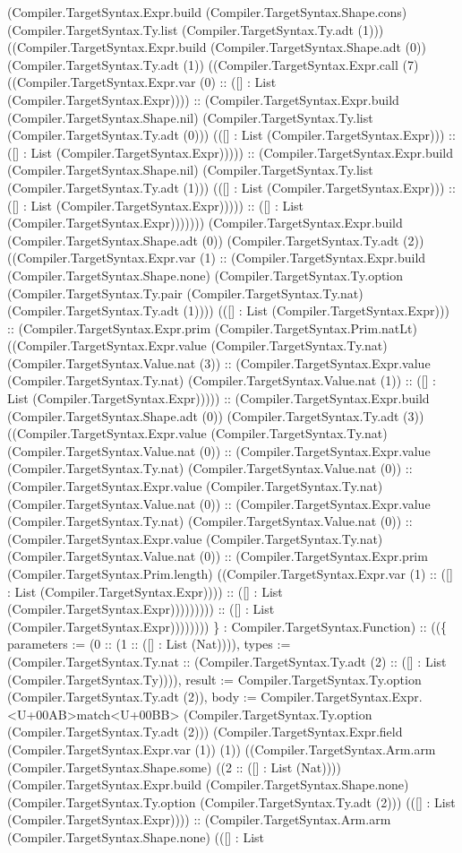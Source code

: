 \documentclass[11pt]{article}
\begin{document}
(Compiler.TargetSyntax.Expr.build (Compiler.TargetSyntax.Shape.cons) (Compiler.TargetSyntax.Ty.list (Compiler.TargetSyntax.Ty.adt (1))) ((Compiler.TargetSyntax.Expr.build (Compiler.TargetSyntax.Shape.adt (0)) (Compiler.TargetSyntax.Ty.adt (1)) ((Compiler.TargetSyntax.Expr.call (7) ((Compiler.TargetSyntax.Expr.var (0) :: ([] : List (Compiler.TargetSyntax.Expr)))) :: (Compiler.TargetSyntax.Expr.build (Compiler.TargetSyntax.Shape.nil) (Compiler.TargetSyntax.Ty.list (Compiler.TargetSyntax.Ty.adt (0))) (([] : List (Compiler.TargetSyntax.Expr))) :: ([] : List (Compiler.TargetSyntax.Expr))))) :: (Compiler.TargetSyntax.Expr.build (Compiler.TargetSyntax.Shape.nil) (Compiler.TargetSyntax.Ty.list (Compiler.TargetSyntax.Ty.adt (1))) (([] : List (Compiler.TargetSyntax.Expr))) :: ([] : List (Compiler.TargetSyntax.Expr))))) :: ([] : List (Compiler.TargetSyntax.Expr))))))) (Compiler.TargetSyntax.Expr.build (Compiler.TargetSyntax.Shape.adt (0)) (Compiler.TargetSyntax.Ty.adt (2)) ((Compiler.TargetSyntax.Expr.var (1) :: (Compiler.TargetSyntax.Expr.build (Compiler.TargetSyntax.Shape.none) (Compiler.TargetSyntax.Ty.option (Compiler.TargetSyntax.Ty.pair (Compiler.TargetSyntax.Ty.nat) (Compiler.TargetSyntax.Ty.adt (1)))) (([] : List (Compiler.TargetSyntax.Expr))) :: (Compiler.TargetSyntax.Expr.prim (Compiler.TargetSyntax.Prim.natLt) ((Compiler.TargetSyntax.Expr.value (Compiler.TargetSyntax.Ty.nat) (Compiler.TargetSyntax.Value.nat (3)) :: (Compiler.TargetSyntax.Expr.value (Compiler.TargetSyntax.Ty.nat) (Compiler.TargetSyntax.Value.nat (1)) :: ([] : List (Compiler.TargetSyntax.Expr))))) :: (Compiler.TargetSyntax.Expr.build (Compiler.TargetSyntax.Shape.adt (0)) (Compiler.TargetSyntax.Ty.adt (3)) ((Compiler.TargetSyntax.Expr.value (Compiler.TargetSyntax.Ty.nat) (Compiler.TargetSyntax.Value.nat (0)) :: (Compiler.TargetSyntax.Expr.value (Compiler.TargetSyntax.Ty.nat) (Compiler.TargetSyntax.Value.nat (0)) :: (Compiler.TargetSyntax.Expr.value (Compiler.TargetSyntax.Ty.nat) (Compiler.TargetSyntax.Value.nat (0)) :: (Compiler.TargetSyntax.Expr.value (Compiler.TargetSyntax.Ty.nat) (Compiler.TargetSyntax.Value.nat (0)) :: (Compiler.TargetSyntax.Expr.value (Compiler.TargetSyntax.Ty.nat) (Compiler.TargetSyntax.Value.nat (0)) :: (Compiler.TargetSyntax.Expr.prim (Compiler.TargetSyntax.Prim.length) ((Compiler.TargetSyntax.Expr.var (1) :: ([] : List (Compiler.TargetSyntax.Expr)))) :: ([] : List (Compiler.TargetSyntax.Expr))))))))) :: ([] : List (Compiler.TargetSyntax.Expr)))))))) \} : Compiler.TargetSyntax.Function) :: ((\{ parameters := (0 :: (1 :: ([] : List (Nat)))), types := (Compiler.TargetSyntax.Ty.nat :: (Compiler.TargetSyntax.Ty.adt (2) :: ([] : List (Compiler.TargetSyntax.Ty)))), result := Compiler.TargetSyntax.Ty.option (Compiler.TargetSyntax.Ty.adt (2)), body := Compiler.TargetSyntax.Expr.<U+00AB>match<U+00BB> (Compiler.TargetSyntax.Ty.option (Compiler.TargetSyntax.Ty.adt (2))) (Compiler.TargetSyntax.Expr.field (Compiler.TargetSyntax.Expr.var (1)) (1)) ((Compiler.TargetSyntax.Arm.arm (Compiler.TargetSyntax.Shape.some) ((2 :: ([] : List (Nat)))) (Compiler.TargetSyntax.Expr.build (Compiler.TargetSyntax.Shape.none) (Compiler.TargetSyntax.Ty.option (Compiler.TargetSyntax.Ty.adt (2))) (([] : List (Compiler.TargetSyntax.Expr)))) :: (Compiler.TargetSyntax.Arm.arm (Compiler.TargetSyntax.Shape.none) (([] : List 
\end{document}
